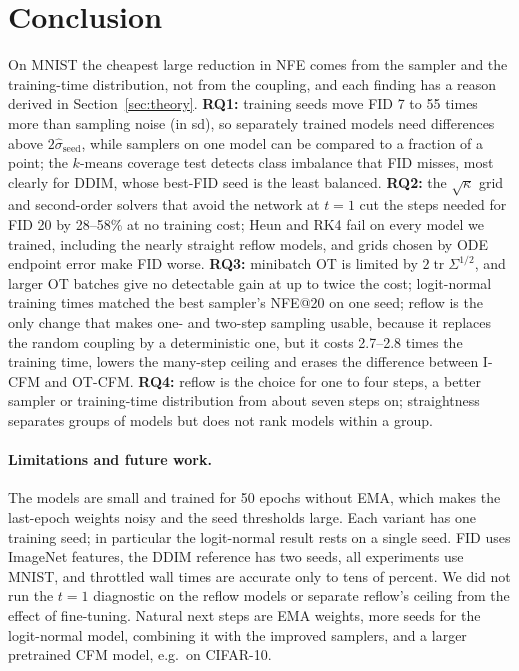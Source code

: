 \section{Conclusion}\label{sec:conclusion}
On MNIST the cheapest large reduction in NFE comes from the sampler and the training-time distribution, not from the coupling, and each finding has a reason derived in Section~\ref{sec:theory}. \textbf{RQ1:} training seeds move FID 7 to 55 times more than sampling noise (in sd), so separately trained models need differences above $2\hat\sigma_{\text{seed}}$, while samplers on one model can be compared to a fraction of a point; the $k$-means coverage test detects class imbalance that FID misses, most clearly for DDIM, whose best-FID seed is the least balanced. \textbf{RQ2:} the $\sqrt\kappa$ grid and second-order solvers that avoid the network at $t=1$ cut the steps needed for FID 20 by 28--58\% at no training cost; Heun and RK4 fail on every model we trained, including the nearly straight reflow models, and grids chosen by ODE endpoint error make FID worse. \textbf{RQ3:} minibatch OT is limited by $2\operatorname{tr}\Sigma^{1/2}$, and larger OT batches give no detectable gain at up to twice the cost; logit-normal training times matched the best sampler's NFE@20 on one seed; reflow is the only change that makes one- and two-step sampling usable, because it replaces the random coupling by a deterministic one, but it costs 2.7--2.8 times the training time, lowers the many-step ceiling and erases the difference between I-CFM and OT-CFM. \textbf{RQ4:} reflow is the choice for one to four steps, a better sampler or training-time distribution from about seven steps on; straightness separates groups of models but does not rank models within a group.

\paragraph{Limitations and future work.} The models are small and trained for 50 epochs without EMA, which makes the last-epoch weights noisy and the seed thresholds large. Each variant has one training seed; in particular the logit-normal result rests on a single seed. FID uses ImageNet features, the DDIM reference has two seeds, all experiments use MNIST, and throttled wall times are accurate only to tens of percent. We did not run the $t=1$ diagnostic on the reflow models or separate reflow's ceiling from the effect of fine-tuning. Natural next steps are EMA weights, more seeds for the logit-normal model, combining it with the improved samplers, and a larger pretrained CFM model, e.g.\ on CIFAR-10.
